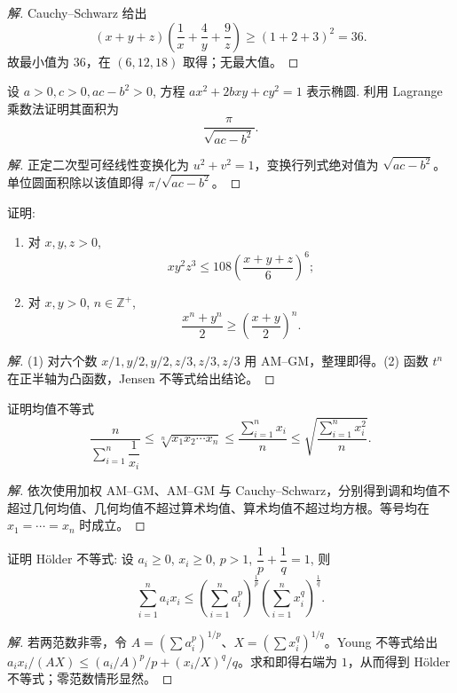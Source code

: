 \documentclass[../../数学分析培优讲义(答案版).tex]{subfiles}
\begin{document}
\begin{proof}[解]
Cauchy--Schwarz 给出
\[
(x+y+z)\left(\dfrac{1}{x}+\dfrac{4}{y}+\dfrac{9}{z}\right)\geq(1+2+3)^2=36.
\]
故最小值为 $36$，在 $(6,12,18)$ 取得；无最大值。
\end{proof}

\begin{example}[\markstar]
设 $a>0,c>0,ac-b^2>0$, 方程 $ax^2+2bxy+cy^2=1$ 表示椭圆. 利用 Lagrange 乘数法证明其面积为
\[
    \dfrac{\pi}{\sqrt{ac-b^2}}.
\]
\end{example}

\begin{proof}[解]
正定二次型可经线性变换化为 $u^2+v^2=1$，变换行列式绝对值为 $\sqrt{ac-b^2}$。单位圆面积除以该值即得 $\pi/\sqrt{ac-b^2}$。
\end{proof}

\begin{example}
证明:
\begin{enumerate}[label=(\arabic*)]
    \item 对 $x,y,z>0$,
    \[
        xy^2z^3\leq108\left(\dfrac{x+y+z}{6}\right)^6;
    \]
    \item 对 $x,y>0$, $n\in\mathbb{Z}^+$,
    \[
        \dfrac{x^n+y^n}{2}\geq\left(\dfrac{x+y}{2}\right)^n.
    \]
\end{enumerate}
\end{example}

\begin{proof}[解]
(1) 对六个数 $x/1,y/2,y/2,z/3,z/3,z/3$ 用 AM--GM，整理即得。(2) 函数 $t^n$ 在正半轴为凸函数，Jensen 不等式给出结论。
\end{proof}

\begin{example}[\markstar]
证明均值不等式
\[
    \dfrac{n}{\displaystyle\sum\limits_{i=1}^n\dfrac{1}{x_i}}
    \leq\sqrt[n]{x_1x_2\cdots x_n}
    \leq\dfrac{\displaystyle\sum\limits_{i=1}^n x_i}{n}
    \leq\sqrt{\dfrac{\displaystyle\sum\limits_{i=1}^n x_i^2}{n}}.
\]
\end{example}

\begin{proof}[解]
依次使用加权 AM--GM、AM--GM 与 Cauchy--Schwarz，分别得到调和均值不超过几何均值、几何均值不超过算术均值、算术均值不超过均方根。等号均在 $x_1=\cdots=x_n$ 时成立。
\end{proof}

\begin{example}[\markstar]
证明 H\"older 不等式: 设 $a_i\geq0$, $x_i\geq0$, $p>1$, $\dfrac{1}{p}+\dfrac{1}{q}=1$, 则
\[
    \sum\limits_{i=1}^na_ix_i
    \leq\left(\sum\limits_{i=1}^na_i^p\right)^{\frac{1}{p}}
    \left(\sum\limits_{i=1}^nx_i^q\right)^{\frac{1}{q}}.
\]
\end{example}

\begin{proof}[解]
若两范数非零，令 $A=(\sum a_i^p)^{1/p}$、$X=(\sum x_i^q)^{1/q}$。Young 不等式给出
$a_ix_i/(AX)\leq (a_i/A)^p/p+(x_i/X)^q/q$。求和即得右端为 $1$，从而得到 H\"older 不等式；零范数情形显然。
\end{proof}
\end{document}
